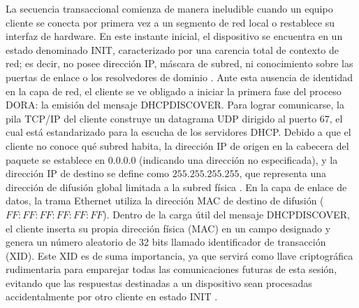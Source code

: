 \documentclass[a4paper,12pt]{article}
\begin{document}
La secuencia transaccional comienza de manera ineludible cuando un equipo cliente se conecta por primera vez a un segmento de red local o restablece su interfaz de hardware. En este instante inicial, el dispositivo se encuentra en un estado denominado INIT, caracterizado por una carencia total de contexto de red; es decir, no posee dirección IP, máscara de subred, ni conocimiento sobre las puertas de enlace o los resolvedores de dominio \cite{serviciosgs_dhcp}. Ante esta ausencia de identidad en la capa de red, el cliente se ve obligado a iniciar la primera fase del proceso DORA: la emisión del mensaje DHCPDISCOVER. Para lograr comunicarse, la pila TCP/IP del cliente construye un datagrama UDP dirigido al puerto 67, el cual está estandarizado para la escucha de los servidores DHCP. Debido a que el cliente no conoce qué subred habita, la dirección IP de origen en la cabecera del paquete se establece en $0.0.0.0$ (indicando una dirección no especificada), y la dirección IP de destino se define como $255.255.255.255$, que representa una dirección de difusión global limitada a la subred física \cite{microsoft_dhcp}. En la capa de enlace de datos, la trama Ethernet utiliza la dirección MAC de destino de difusión ($FF:FF:FF:FF:FF:FF$). Dentro de la carga útil del mensaje DHCPDISCOVER, el cliente inserta su propia dirección física (MAC) en un campo designado y genera un número aleatorio de 32 bits llamado identificador de transacción (XID). Este XID es de suma importancia, ya que servirá como llave criptográfica rudimentaria para emparejar todas las comunicaciones futuras de esta sesión, evitando que las respuestas destinadas a un dispositivo sean procesadas accidentalmente por otro cliente en estado INIT \cite{rfc2131}.
\end{document}
